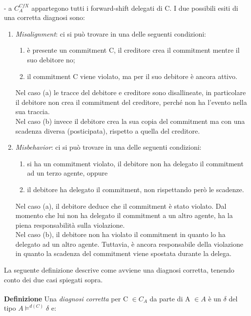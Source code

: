 \documentclass[a4paper,12pt]{report}
\begin{document}
\\- a $C^{CfX}_A$ appartegono tutti i forward-shift delegati di C.
\newpage
I due possibili esiti di una corretta diagnosi sono:
\begin{enumerate}
    \item \textit{Misalignment}: ci si può trovare in una delle seguenti condizioni:
    \begin{enumerate}
        \item è presente un commitment C, il creditore crea il commitment mentre il suo debitore no;
        \item il commitment C viene violato, ma per il suo debitore è ancora attivo.
    \end{enumerate}
    Nel caso (a) le tracce del debitore e creditore sono disallineate, in particolare il debitore non crea il commitment del creditore, perché non ha l'evento nella sua traccia.\\
    Nel caso (b) invece il debitore crea la sua copia del commitment ma con una scadenza diversa (posticipata), rispetto a quella del creditore.
    \item \textit{Misbehavior}: ci si può trovare in una delle seguenti condizioni:
    \begin{enumerate}
        \item si ha un commitment violato, il debitore non ha delegato il commitment ad un terzo agente, oppure
        \item il debitore ha delegato il commitment, non rispettando però le scadenze.
    \end{enumerate}
    Nel caso (a), il debitore deduce che il commitment è stato violato. Dal momento che lui non ha delegato il commitment a un altro agente, ha la piena responsabilità sulla violazione.\\
    Nel caso (b), il debitore non ha violato il commitment in quanto lo ha delegato ad un altro agente. Tuttavia, è ancora responsabile della violazione in quanto la scadenza del commitment viene spostata durante la delega.
\end{enumerate}
\newpage
La seguente definizione descrive come avviene una diagnosi corretta, tenendo conto dei due casi spiegati sopra.\\
\\\textbf{Definizione} Una \textit{diagnosi corretta} per C $\in C_A$ da parte di A $\in A$ è un $\delta$ del tipo $A\models^{d(C)} \delta$ e:
\end{document}
